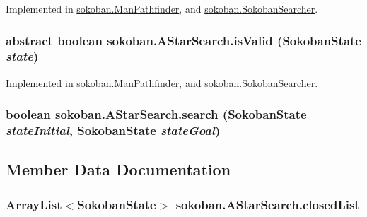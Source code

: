 Implemented in \hyperlink{classsokoban_1_1ManPathfinder_279eb3ffae4e5ca01fba414916fa9f40}{sokoban.ManPathfinder}, and \hyperlink{classsokoban_1_1SokobanSearcher_e71f7570b3b8f44fae9c5999ef1cb585}{sokoban.SokobanSearcher}.\hypertarget{classsokoban_1_1AStarSearch_d41e3201335321840a0d8bac8a66f86f}{
\subsubsection[{isValid}]{\setlength{\rightskip}{0pt plus 5cm}abstract boolean sokoban.AStarSearch.isValid ({\bf SokobanState} {\em state})}}
\label{classsokoban_1_1AStarSearch_d41e3201335321840a0d8bac8a66f86f}




Implemented in \hyperlink{classsokoban_1_1ManPathfinder_b32f8b3f28f89843bf9942f50faed667}{sokoban.ManPathfinder}, and \hyperlink{classsokoban_1_1SokobanSearcher_e5825be60850700a399b70cab9549ab3}{sokoban.SokobanSearcher}.\hypertarget{classsokoban_1_1AStarSearch_0e98e5fd53a87168775b34c637eca896}{
\subsubsection[{search}]{\setlength{\rightskip}{0pt plus 5cm}boolean sokoban.AStarSearch.search ({\bf SokobanState} {\em stateInitial}, \/  {\bf SokobanState} {\em stateGoal})}}
\label{classsokoban_1_1AStarSearch_0e98e5fd53a87168775b34c637eca896}




\subsection{Member Data Documentation}
\hypertarget{classsokoban_1_1AStarSearch_a2d06ef736198f6c282391db3af61317}{
\subsubsection[{closedList}]{\setlength{\rightskip}{0pt plus 5cm}ArrayList$<${\bf SokobanState}$>$ {\bf sokoban.AStarSearch.closedList}}}
\label{classsokoban_1_1AStarSearch_a2d06ef736198f6c282391db3af61317}


